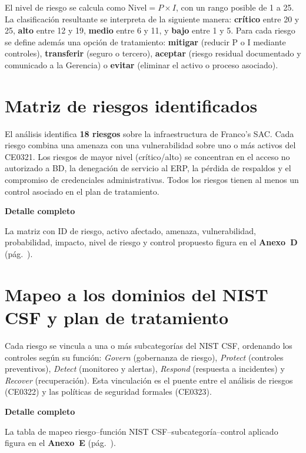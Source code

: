 \documentclass[11pt, a4paper, oneside]{report}
\newenvironment{notabox}[1]{%
  \begin{lrbox}{\notaboxsb}%
  \begin{minipage}{\dimexpr\textwidth-2\fboxsep\relax}%
  \vspace{4pt}\textcolor{upeu_dark}{\textbf{#1}}\\[2pt]\small%
}{%
  \vspace{4pt}%
  \end{minipage}%
  \end{lrbox}%
  \vspace{6pt}\par\noindent\colorbox{upeu_light}{\usebox{\notaboxsb}}\par\vspace{6pt}%
}
\begin{document}
\normalsize

El nivel de riesgo se calcula como $\text{Nivel} = P \times I$, con un rango posible de 1 a 25. La clasificación resultante se interpreta de la siguiente manera: \textcolor{sev_critico}{\textbf{crítico}} entre 20 y 25, \textcolor{sev_alto}{\textbf{alto}} entre 12 y 19, \textcolor{sev_medio}{\textbf{medio}} entre 6 y 11, y \textcolor{sev_bajo}{\textbf{bajo}} entre 1 y 5. Para cada riesgo se define además una opción de tratamiento: \textbf{mitigar} (reducir P o I mediante controles), \textbf{transferir} (seguro o tercero), \textbf{aceptar} (riesgo residual documentado y comunicado a la Gerencia) o \textbf{evitar} (eliminar el activo o proceso asociado).

\section{Matriz de riesgos identificados}

El análisis identifica \textbf{18 riesgos} sobre la infraestructura de Franco's SAC. Cada riesgo combina una amenaza con una vulnerabilidad sobre uno o más activos del CE0321. Los riesgos de mayor nivel (crítico/alto) se concentran en el acceso no autorizado a BD, la denegación de servicio al ERP, la pérdida de respaldos y el compromiso de credenciales administrativas. Todos los riesgos tienen al menos un control asociado en el plan de tratamiento.

\begin{notabox}{Detalle completo}
La matriz con ID de riesgo, activo afectado, amenaza, vulnerabilidad, probabilidad, impacto, nivel de riesgo y control propuesto figura en el \textbf{Anexo~D} (pág.~\pageref{anex:matriz_riesgos}).
\end{notabox}
\section{Mapeo a los dominios del NIST CSF y plan de tratamiento}

Cada riesgo se vincula a una o más subcategorías del NIST CSF, ordenando los controles según su función: \textit{Govern} (gobernanza de riesgo), \textit{Protect} (controles preventivos), \textit{Detect} (monitoreo y alertas), \textit{Respond} (respuesta a incidentes) y \textit{Recover} (recuperación). Esta vinculación es el puente entre el análisis de riesgos (CE0322) y las políticas de seguridad formales (CE0323).

\begin{notabox}{Detalle completo}
La tabla de mapeo riesgo--función NIST CSF--subcategoría--control aplicado figura en el \textbf{Anexo~E} (pág.~\pageref{anex:nist_tratamiento}).
\end{notabox}
\end{document}
